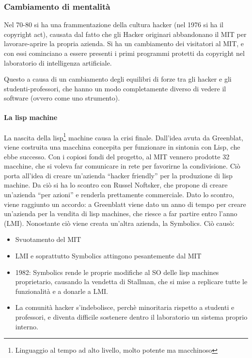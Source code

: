 \subsubsection{Cambiamento di mentalit\`a}

Nel 70-80 si ha una frammentazione della cultura hacker (nel 1976 si ha il copyright act), causata dal fatto che gli Hacker originari abbandonano il MIT per lavorare-aprire la propria azienda. Si ha un cambiamento dei visitatori al MIT, e con essi cominciano a essere presenti i primi programmi protetti da copyright nel laboratorio di intelligenza artificiale.

Questo a causa di un cambiamento degli equilibri di forze tra gli hacker e gli studenti-professori, che hanno un modo completamente diverso di vedere il software (ovvero come uno strumento).

\paragraph*{La lisp machine} La nascita della lisp\footnote{Linguaggio al tempo ad alto livello, molto potente ma macchinoso} machine causa la crisi finale. Dall'idea avuta da Greenblat, viene costruita una macchina concepita per funzionare in sintonia con Lisp, che ebbe successo. Con i copiosi fondi del progetto, al MIT vennero prodotte 32 macchine, che si voleva far comunicare in rete per favorirne la condivisione. Ci\`o porta all'idea di creare un'azienda ``hacker friendly'' per la produzione di lisp machine. Da ci\`o si ha lo scontro con Russel Noftsker, che propone di creare un'azienda ``per azioni'' e renderla prettamente commerciale. Dato lo scontro, viene raggiunto un accordo: a Greenblatt viene dato un anno di tempo per creare un'azienda per la vendita di lisp machines, che riesce a far partire entro l'anno (LMI). Nonostante ci\`o viene creata un'altra azienda, la Symbolics. Ci\`o caus\`o:
\begin{itemize}

\item Svuotamento del MIT
\item LMI e soprattutto Symbolics attingono pesantemente dal MIT
\item 1982: Symbolics rende le proprie modifiche al SO delle lisp machines proprietario, causando la vendetta di Stallman, che si mise a replicare tutte le funzionalit\`a e a donarle a LMI.
\item La comunit\`a hacker s'indebolisce, perch\`e minoritaria rispetto a studenti e professori, e diventa difficile sostenere dentro il laboratorio un sistema proprio interno.

\end{itemize}

